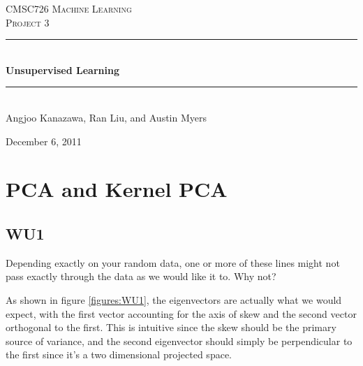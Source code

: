\documentclass[a4paper,11pt]{article}
\newcommand{\HRule}{\rule{\linewidth}{0.5mm}}
\begin{document}
\begin{titlepage}
\begin{center}

\textsc{\LARGE CMSC726 Machine Learning}\\[1.5cm]

\textsc{\Large Project 3}\\[0.5cm]

\HRule \\[0.5cm]

{ \huge \bfseries Unsupervised Learning}\\[0.4cm]

\HRule \\[1.5cm]

{\large Angjoo Kanazawa, Ran Liu, and Austin Myers}

\vfill

{\large December 6, 2011}

\end{center}
\end{titlepage}

\section{PCA and Kernel PCA}
\subsection{WU1}
\textsf{Depending exactly on your random data, one or more of these lines might
not pass exactly through the data as we would like it to. Why not?}\vspace{0.1in}

As shown in figure \ref{figures:WU1}, the eigenvectors are actually what we would
expect, with the first vector accounting for the axis of skew and the second vector
orthogonal to the first. This is intuitive since the skew should be the primary
source of variance, and the second eigenvector should simply be perpendicular
to the first since it's a two dimensional projected space.
\end{document}
